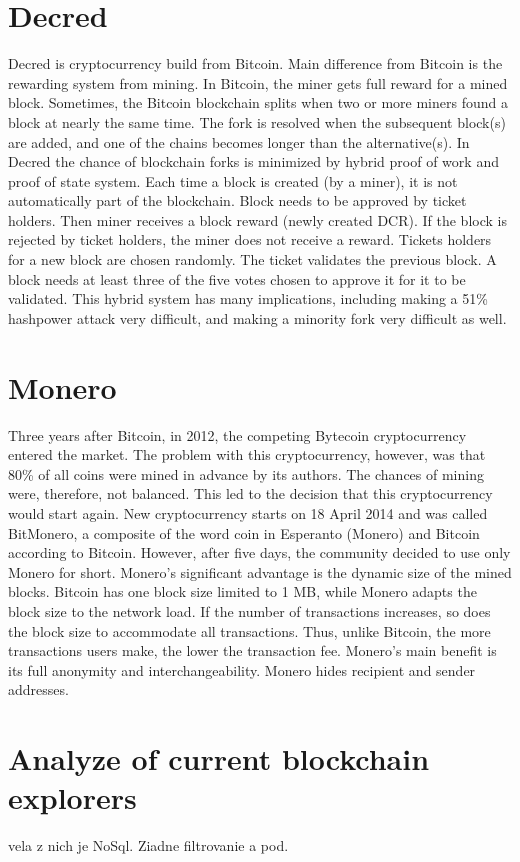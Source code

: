 \section{Decred}
Decred is cryptocurrency build from Bitcoin. Main difference from Bitcoin is the rewarding system from mining. In Bitcoin, the miner gets full reward for a mined block. Sometimes, the Bitcoin blockchain splits when two or more miners found a block at nearly the same time. The fork is resolved when the subsequent block(s) are added, and one of the chains becomes longer than the alternative(s). In Decred the chance of blockchain forks is minimized by hybrid proof of work and proof of state system. Each time a block is created (by a miner), it is not automatically part of the blockchain. Block needs to be approved by ticket holders. Then miner receives a block reward (newly created DCR). If the block is rejected by ticket holders, the miner does not receive a reward. Tickets holders for a new block are chosen randomly. The ticket validates the previous block. A block needs at least three of the five votes chosen to approve it for it to be validated.  This hybrid system has many implications, including making a 51\% hashpower attack very difficult, and making a minority fork very difficult as well.\cite{decredWhitePaper}

\section{Monero}
Three years after Bitcoin, in 2012, the competing Bytecoin cryptocurrency entered the market. The problem with this cryptocurrency, however, was that 80\% of all coins were mined in advance by its authors. The chances of mining were, therefore, not balanced. This led to the decision that this cryptocurrency would start again. New cryptocurrency starts on 18 April 2014 and was called BitMonero, a composite of the word coin in Esperanto (Monero) and Bitcoin according to Bitcoin. However, after five days, the community decided to use only Monero for short. Monero's significant advantage is the dynamic size of the mined blocks. Bitcoin has one block size limited to 1 MB, while Monero adapts the block size to the network load. If the number of transactions increases, so does the block size to accommodate all transactions. Thus, unlike Bitcoin, the more transactions users make, the lower the transaction fee. Monero's main benefit is its full anonymity and interchangeability. Monero hides recipient and sender addresses.\cite{moneroTracebility}

\section{Analyze of current blockchain explorers}
vela z nich je NoSql. Ziadne filtrovanie a pod.